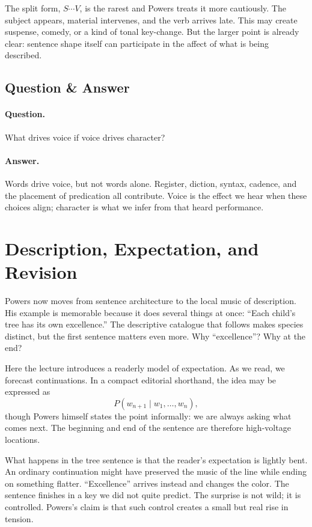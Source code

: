 The split form, $S\cdots V$, is the rarest and Powers treats it more cautiously. The subject appears, material intervenes, and the verb arrives late. This may create suspense, comedy, or a kind of tonal key-change. But the larger point is already clear: sentence shape itself can participate in the affect of what is being described.

\subsection{Question \& Answer}

\paragraph{Question.} What drives voice if voice drives character?

\paragraph{Answer.} Words drive voice, but not words alone. Register, diction, syntax, cadence, and the placement of predication all contribute. Voice is the effect we hear when these choices align; character is what we infer from that heard performance.

\section{Description, Expectation, and Revision}

Powers now moves from sentence architecture to the local music of description. His example is memorable because it does several things at once: ``Each child's tree has its own excellence.'' The descriptive catalogue that follows makes species distinct, but the first sentence matters even more. Why ``excellence''? Why at the end?

Here the lecture introduces a readerly model of expectation. As we read, we forecast continuations. In a compact editorial shorthand, the idea may be expressed as
\begin{equation}
P(w_{n+1}\mid w_1,\dots,w_n),
\end{equation}
though Powers himself states the point informally: we are always asking what comes next. The beginning and end of the sentence are therefore high-voltage locations.

What happens in the tree sentence is that the reader's expectation is lightly bent. An ordinary continuation might have preserved the music of the line while ending on something flatter. ``Excellence'' arrives instead and changes the color. The sentence finishes in a key we did not quite predict. The surprise is not wild; it is controlled. Powers's claim is that such control creates a small but real rise in tension.

